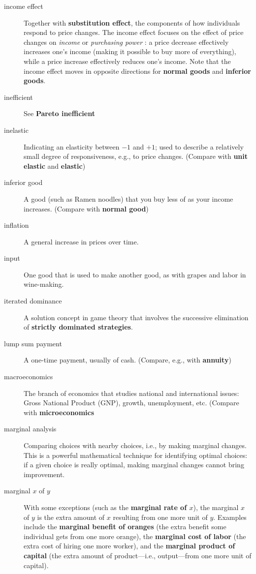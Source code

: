 \begin{description}
\item[income effect] Together with \textbf{substitution effect}, the components of how individuals respond to price changes. The income effect focuses on the effect of price changes on \emph{income} or \emph{purchasing power} : a price decrease effectively increases one's income (making it possible to buy more of everything), while a price increase effectively reduces one's income. Note that the income effect moves in opposite directions for \textbf{normal goods} and \textbf{inferior goods}.  

\item[inefficient] See \textbf{Pareto inefficient}

\item[inelastic] Indicating an elasticity between $-1$ and $+1$; used to describe a relatively small degree of responsiveness, e.g., to price changes. (Compare with \textbf{unit elastic} and \textbf{elastic})

\item[inferior good] A good (such as Ramen noodles) that you buy less of as your income increases. (Compare with \textbf{normal good})

\item[inflation] A general increase in prices over time. 

\item[input] One good that is used to make another good, as with grapes and labor in wine-making.

\item[iterated dominance] A solution concept in game theory that involves the successive elimination of \textbf{strictly dominated strategies}.

\item[lump sum payment] A one-time payment, usually of cash. (Compare, e.g., with \textbf{annuity})

\item[macroeconomics] The branch of economics that studies national and international issues: Gross National Product (GNP), growth, unemployment, etc. (Compare with \textbf{microeconomics}

\item[marginal analysis] Comparing choices with nearby choices, i.e., by making marginal changes. This is a powerful mathematical technique for identifying optimal choices: if a given choice is really optimal, making marginal changes cannot bring improvement.

\item[marginal $x$ of $y$] With some exceptions (such as the \textbf{marginal rate of $x$}), the marginal $x$ of $y$ is the extra amount of $x$ resulting from one more unit of $y$. Examples include the \textbf{marginal benefit of oranges} (the extra benefit some individual gets from one more orange), the \textbf{marginal cost of labor} (the extra cost of hiring one more worker), and the \textbf{marginal product of capital} (the extra amount of product---i.e., output---from one more unit of capital). 


\end{description}
